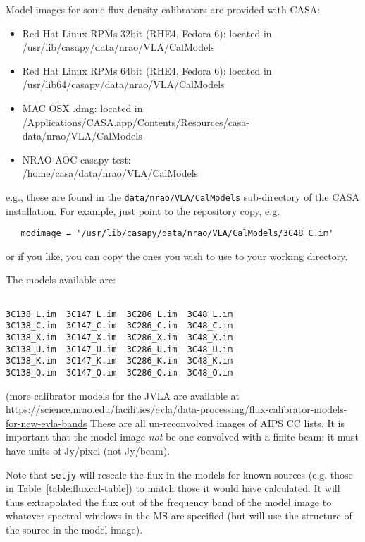 Model images for some flux density calibrators are provided with CASA:
\begin{itemize}
   \item Red Hat Linux RPMs 32bit (RHE4, Fedora 6): 
         located in\\ /usr/lib/casapy/data/nrao/VLA/CalModels
   \item Red Hat Linux RPMs 64bit (RHE4, Fedora 6): 
         located in\\ /usr/lib64/casapy/data/nrao/VLA/CalModels
   \item MAC OSX .dmg: located in\\ /Applications/CASA.app/Contents/Resources/casa-data/nrao/VLA/CalModels
   \item NRAO-AOC casapy-test:\\ /home/casa/data/nrao/VLA/CalModels
\end{itemize}
e.g., these are found in the {\tt data/nrao/VLA/CalModels}
sub-directory of the CASA installation.  For example, just point to the
repository copy, e.g.
\small
\begin{verbatim}
   modimage = '/usr/lib/casapy/data/nrao/VLA/CalModels/3C48_C.im'
\end{verbatim}
\normalsize
or if you like, you can copy the ones you wish to use to your working
directory.

The models available are:
\small
\begin{verbatim}

3C138_L.im  3C147_L.im  3C286_L.im  3C48_L.im
3C138_C.im  3C147_C.im  3C286_C.im  3C48_C.im
3C138_X.im  3C147_X.im  3C286_X.im  3C48_X.im
3C138_U.im  3C147_U.im  3C286_U.im  3C48_U.im
3C138_K.im  3C147_K.im  3C286_K.im  3C48_K.im
3C138_Q.im  3C147_Q.im  3C286_Q.im  3C48_Q.im
\end{verbatim}

(more calibrator models for the JVLA are available at\\
\url{https://science.nrao.edu/facilities/evla/data-processing/flux-calibrator-models-for-new-evla-bands}
\normalsize
These are all un-reconvolved images of AIPS CC lists.  
It is important that the model image {\em not} be one
convolved with a finite beam; it must have units of Jy/pixel (not
Jy/beam).  

Note that {\tt setjy} will rescale the flux in the models for known
sources (e.g. those in Table~\ref{table:fluxcal-table}) to match those
it would have calculated.  It will thus extrapolated the flux out of
the frequency band of the model image to whatever spectral windows
in the MS are specified (but will use the structure of the source
in the model image).

